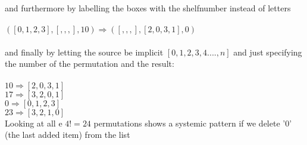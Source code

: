 \documentclass{article} %
\begin{document}
\noindent and furthermore by labelling the boxes with the shelfnumber instead of letters
\\
\\
\(   ( [0,1,2,3], [, , , ], 10)    \Rightarrow  ( [,,,], [2 ,0, 3, 1 ], 0)    \) 
\\
\\
and finally by letting the source be implicit  \( [0,1,2,3,4....,n]  \)  and just specifying the number of the  permutation  and the result: 
\\
\\
\(     10   \Rightarrow  [2 ,0, 3, 1 ]    \) 
\\
\(     17   \Rightarrow  [3 ,2, 0, 1 ]    \) 
\\
\(     0   \Rightarrow  [0 ,1, 2, 3 ]    \) 
\\
\(     23  \Rightarrow  [3 ,2, 1, 0 ]    \) 
\\
\newpage
\noindent
Looking at all  e \(  4!  = 24  \)  permutations shows a systemic pattern  if we delete '0' (the last added item) from the list
\end{document}
